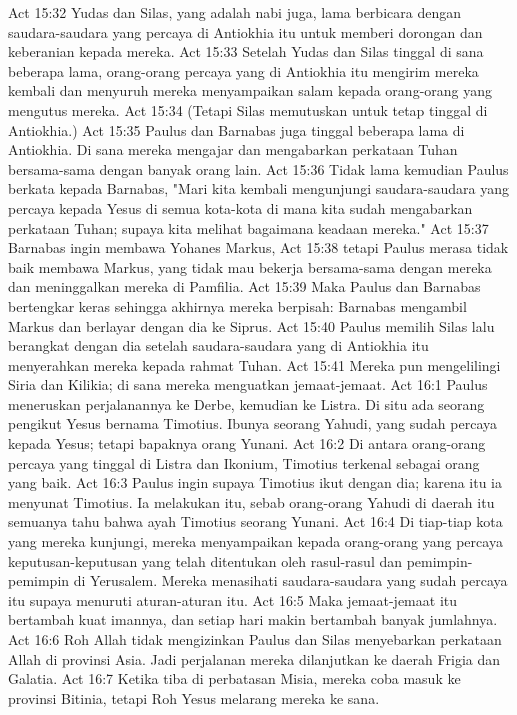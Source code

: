 Act 15:32  Yudas dan Silas, yang adalah nabi juga, lama berbicara dengan saudara-saudara yang percaya di Antiokhia itu untuk memberi dorongan dan keberanian kepada mereka.
Act 15:33  Setelah Yudas dan Silas tinggal di sana beberapa lama, orang-orang percaya yang di Antiokhia itu mengirim mereka kembali dan menyuruh mereka menyampaikan salam kepada orang-orang yang mengutus mereka.
Act 15:34  (Tetapi Silas memutuskan untuk tetap tinggal di Antiokhia.)
Act 15:35  Paulus dan Barnabas juga tinggal beberapa lama di Antiokhia. Di sana mereka mengajar dan mengabarkan perkataan Tuhan bersama-sama dengan banyak orang lain.
Act 15:36  Tidak lama kemudian Paulus berkata kepada Barnabas, "Mari kita kembali mengunjungi saudara-saudara yang percaya kepada Yesus di semua kota-kota di mana kita sudah mengabarkan perkataan Tuhan; supaya kita melihat bagaimana keadaan mereka."
Act 15:37  Barnabas ingin membawa Yohanes Markus,
Act 15:38  tetapi Paulus merasa tidak baik membawa Markus, yang tidak mau bekerja bersama-sama dengan mereka dan meninggalkan mereka di Pamfilia.
Act 15:39  Maka Paulus dan Barnabas bertengkar keras sehingga akhirnya mereka berpisah: Barnabas mengambil Markus dan berlayar dengan dia ke Siprus.
Act 15:40  Paulus memilih Silas lalu berangkat dengan dia setelah saudara-saudara yang di Antiokhia itu menyerahkan mereka kepada rahmat Tuhan.
Act 15:41  Mereka pun mengelilingi Siria dan Kilikia; di sana mereka menguatkan jemaat-jemaat.
Act 16:1  Paulus meneruskan perjalanannya ke Derbe, kemudian ke Listra. Di situ ada seorang pengikut Yesus bernama Timotius. Ibunya seorang Yahudi, yang sudah percaya kepada Yesus; tetapi bapaknya orang Yunani.
Act 16:2  Di antara orang-orang percaya yang tinggal di Listra dan Ikonium, Timotius terkenal sebagai orang yang baik.
Act 16:3  Paulus ingin supaya Timotius ikut dengan dia; karena itu ia menyunat Timotius. Ia melakukan itu, sebab orang-orang Yahudi di daerah itu semuanya tahu bahwa ayah Timotius seorang Yunani.
Act 16:4  Di tiap-tiap kota yang mereka kunjungi, mereka menyampaikan kepada orang-orang yang percaya keputusan-keputusan yang telah ditentukan oleh rasul-rasul dan pemimpin-pemimpin di Yerusalem. Mereka menasihati saudara-saudara yang sudah percaya itu supaya menuruti aturan-aturan itu.
Act 16:5  Maka jemaat-jemaat itu bertambah kuat imannya, dan setiap hari makin bertambah banyak jumlahnya.
Act 16:6  Roh Allah tidak mengizinkan Paulus dan Silas menyebarkan perkataan Allah di provinsi Asia. Jadi perjalanan mereka dilanjutkan ke daerah Frigia dan Galatia.
Act 16:7  Ketika tiba di perbatasan Misia, mereka coba masuk ke provinsi Bitinia, tetapi Roh Yesus melarang mereka ke sana.
